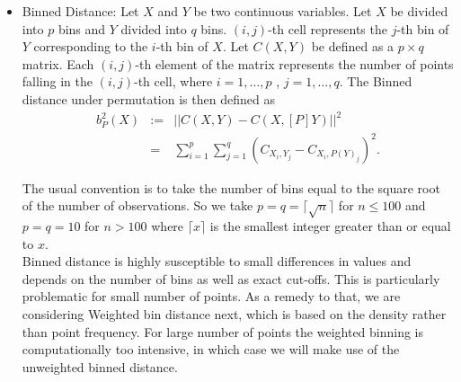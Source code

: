 \begin{itemize}
\item Binned Distance:
Let $X$ and $Y$ be two continuous variables. Let $X$ be divided into $p$ bins and $Y$ divided into $q$ bins. $(i,j)$-th cell represents the $j$-th bin of $Y$ corresponding to the $i$-th bin of $X$. Let $C(X,Y)$ be defined as a $p \times q$ matrix. Each $(i,j)$-th element of the matrix represents the number of points falling in the $(i,j)$-th cell, where $i = 1, \dots, p$ , $j = 1, \dots, q$.
The Binned distance under permutation is then defined as
\begin{eqnarray*}
b^2_P(X) &:=& ||C(X,Y) - C(X,[P]Y)||^2 \\ &=& \sum_{i=1}^p \sum_{j=1}^q (C_{X_i,Y_j} - C_{X_i,P(Y)_j})^2.
\end{eqnarray*}

The usual convention is to take the number of bins equal to the square root of the number of observations. So we take $p = q = \lceil{\sqrt{n}} \rceil$ for $n \leq 100$ and $p = q = 10$ for $n > 100$ where $\lceil{x} \rceil$ is the smallest integer greater than or equal to $x$. \\

Binned distance is highly susceptible to small differences in values and depends on the number of bins as well as exact cut-offs. This is particularly problematic for small number of points. As a remedy to that, we are considering Weighted bin distance next, which is based on the density rather than point frequency. For large number of points the weighted binning is computationally too intensive, in which case we will make use of the unweighted  binned distance.



\end{itemize}
